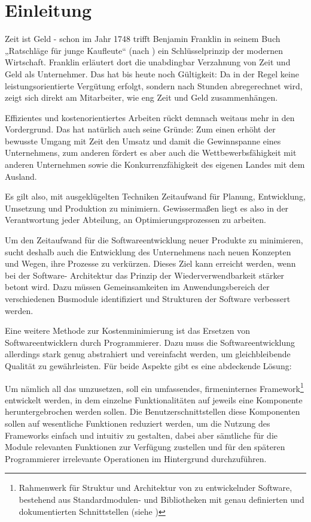 \thispagestyle{firstPage}

\section{Einleitung}
\label{sec:introduction}

\glqq Zeit ist Geld \grqq- schon im Jahr 1748 trifft Benjamin Franklin in seinem Buch „Ratschläge für junge Kaufleute“  (nach \textcite[][]{ZeitIstGeld.2022}) ein Schlüsselprinzip der modernen Wirtschaft.
Franklin erläutert dort die unabdingbar Verzahnung von Zeit und Geld als Unternehmer. 
Das hat bis heute noch Gültigkeit:
Da in der Regel keine leistungsorientierte Vergütung erfolgt, sondern nach Stunden abregerechnet wird, zeigt sich direkt am Mitarbeiter, wie eng Zeit und Geld zusammenhängen.

Effizientes und kostenorientiertes Arbeiten rückt demnach weitaus mehr in den Vordergrund.
Das hat natürlich auch seine Gründe: Zum einen erhöht der bewusste Umgang mit Zeit den Umsatz und damit die Gewinnspanne eines Unternehmens, zum anderen fördert es aber auch die Wettbewerbsfähigkeit mit anderen Unternehmen sowie die Konkurrenzfähigkeit des eigenen Landes mit dem Ausland.

Es gilt also, mit ausgeklügelten Techniken Zeitaufwand für Planung, Entwicklung, Umsetzung und Produktion zu minimiern. 
Gewissermaßen liegt es also in der Verantwortung jeder Abteilung, an Optimierungsprozessen zu arbeiten.

Um den Zeitaufwand für die Softwareentwicklung neuer Produkte zu minimieren, sucht deshalb auch die Entwicklung des Unternehmens nach neuen Konzepten und Wegen, ihre Prozesse zu verkürzen.
Dieses Ziel kann erreicht werden, wenn bei der Software- Architektur das Prinzip der Wiederverwendbarkeit stärker betont wird.
Dazu müssen Gemeinsamkeiten im Anwendungsbereich der verschiedenen Busmodule identifiziert  und Strukturen der Software verbessert werden.

Eine weitere Methode zur Kostenminimierung ist das Ersetzen von Softwareentwicklern durch Programmierer. Dazu muss die Softwareentwicklung allerdings stark genug abstrahiert und vereinfacht werden, um gleichbleibende Qualität zu gewährleisten.
Für beide Aspekte gibt es eine abdeckende Lösung:

Um nämlich all das umzusetzen, soll ein umfassendes, firmeninternes Framework\footnote{Rahmenwerk für Struktur und Architektur von zu entwickelnder Software, bestehend aus Standardmodulen- und Bibliotheken mit genau definierten und dokumentierten Schnittstellen (siehe \textcite[][]{ITGlossar.2021})}
entwickelt werden, in dem einzelne Funktionalitäten auf jeweils eine Komponente heruntergebrochen werden sollen. 
Die Benutzerschnittstellen diese Komponenten sollen auf wesentliche Funktionen reduziert werden, um die Nutzung des Frameworks einfach und intuitiv zu gestalten, dabei aber sämtliche für die Module relevanten Funktionen zur Verfügung zustellen und für den späteren Programmierer irrelevante Operationen im Hintergrund durchzuführen.

